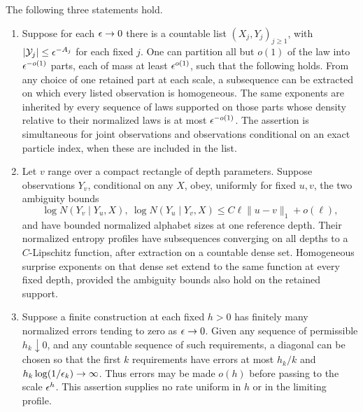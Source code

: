 \begin{lemma}
\label{lem:profile-diagonal}
The following three statements hold.
\begin{enumerate}
\item
Suppose for each $\epsilon\to0$ there is a countable list
$(X_j,Y_j)_{j\ge1}$, with
$|\mathcal Y_j|\le\epsilon^{-A_j}$ for each fixed $j$.
One can partition all but $o(1)$ of the law into
$\epsilon^{-o(1)}$ parts, each of mass at least $\epsilon^{o(1)}$,
such that the following holds.  From any choice of one retained
part at each scale, a subsequence can be extracted on which every
listed observation is homogeneous.  The same exponents are inherited
by every sequence of laws supported on those parts whose density
relative to their normalized laws is at most $\epsilon^{-o(1)}$.
The assertion is simultaneous for joint observations and observations
conditional on an exact particle index, when these are included in
the list.
\item
Let $v$ range over a compact rectangle of depth parameters.
Suppose observations $Y_v$, conditional on any $X$, obey, uniformly
for fixed $u,v$, the two ambiguity bounds
\[
 \log N(Y_v\mid Y_u,X),\ \log N(Y_u\mid Y_v,X)
       \le C\ell\|u-v\|_1+o(\ell),
\]
and have bounded normalized alphabet sizes at one reference depth.
Their normalized entropy profiles have subsequences converging on
all depths to a $C$-Lipschitz function, after extraction on a countable
dense set.  Homogeneous surprise exponents on that dense set extend
to the same function at every fixed depth, provided the ambiguity
bounds also hold on the retained support.
\item
Suppose a finite construction at each fixed $h>0$ has finitely many
normalized errors tending to zero as $\epsilon\to0$.  Given any sequence
of permissible $h_k\downarrow0$, and any countable sequence of such
requirements, a diagonal can be chosen so that the first $k$
requirements have errors at most $h_k/k$ and
$h_k\log(1/\epsilon_k)\to\infty$.
Thus errors may be made $o(h)$ before passing to the scale
$\epsilon^h$.  This assertion supplies no rate uniform in $h$ or in the
limiting profile.
\end{enumerate}
\end{lemma}

